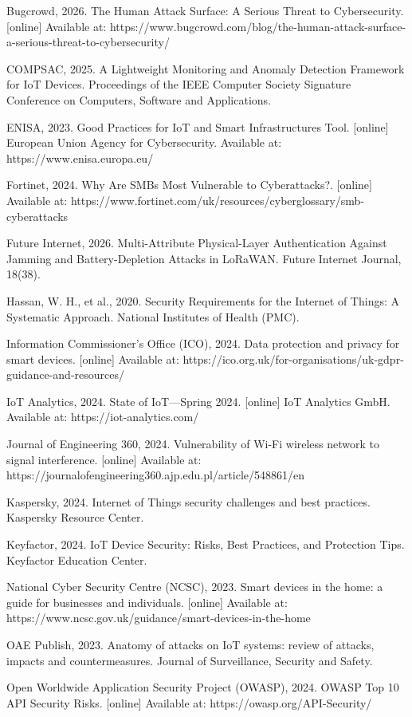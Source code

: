 Bugcrowd, 2026. The Human Attack Surface: A Serious Threat to Cybersecurity. [online] Available at: https://www.bugcrowd.com/blog/the-human-attack-surface-a-serious-threat-to-cybersecurity/

COMPSAC, 2025. A Lightweight Monitoring and Anomaly Detection Framework for IoT Devices. Proceedings of the IEEE Computer Society Signature Conference on Computers, Software and Applications.

ENISA, 2023. Good Practices for IoT and Smart Infrastructures Tool. [online] European Union Agency for Cybersecurity. Available at: https://www.enisa.europa.eu/

Fortinet, 2024. Why Are SMBs Most Vulnerable to Cyberattacks?. [online] Available at: https://www.fortinet.com/uk/resources/cyberglossary/smb-cyberattacks

Future Internet, 2026. Multi-Attribute Physical-Layer Authentication Against Jamming and Battery-Depletion Attacks in LoRaWAN. Future Internet Journal, 18(38).

Hassan, W. H., et al., 2020. Security Requirements for the Internet of Things: A Systematic Approach. National Institutes of Health (PMC).

Information Commissioner's Office (ICO), 2024. Data protection and privacy for smart devices. [online] Available at: https://ico.org.uk/for-organisations/uk-gdpr-guidance-and-resources/

IoT Analytics, 2024. State of IoT---Spring 2024. [online] IoT Analytics GmbH. Available at: https://iot-analytics.com/

Journal of Engineering 360, 2024. Vulnerability of Wi-Fi wireless network to signal interference. [online] Available at: https://journalofengineering360.ajp.edu.pl/article/548861/en

Kaspersky, 2024. Internet of Things security challenges and best practices. Kaspersky Resource Center.

Keyfactor, 2024. IoT Device Security: Risks, Best Practices, and Protection Tips. Keyfactor Education Center.

National Cyber Security Centre (NCSC), 2023. Smart devices in the home: a guide for businesses and individuals. [online] Available at: https://www.ncsc.gov.uk/guidance/smart-devices-in-the-home

OAE Publish, 2023. Anatomy of attacks on IoT systems: review of attacks, impacts and countermeasures. Journal of Surveillance, Security and Safety.

Open Worldwide Application Security Project (OWASP), 2024. OWASP Top 10 API Security Risks. [online] Available at: https://owasp.org/API-Security/

